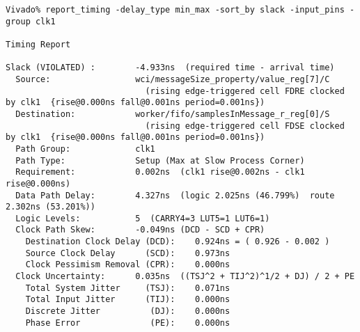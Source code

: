 \documentclass{article}
\begin{document}
\begin{lstlisting}
Vivado% report_timing -delay_type min_max -sort_by slack -input_pins -group clk1

Timing Report

Slack (VIOLATED) :        -4.933ns  (required time - arrival time)
  Source:                 wci/messageSize_property/value_reg[7]/C
                            (rising edge-triggered cell FDRE clocked by clk1  {rise@0.000ns fall@0.001ns period=0.001ns})
  Destination:            worker/fifo/samplesInMessage_r_reg[0]/S
                            (rising edge-triggered cell FDSE clocked by clk1  {rise@0.000ns fall@0.001ns period=0.001ns})
  Path Group:             clk1
  Path Type:              Setup (Max at Slow Process Corner)
  Requirement:            0.002ns  (clk1 rise@0.002ns - clk1 rise@0.000ns)
  Data Path Delay:        4.327ns  (logic 2.025ns (46.799%)  route 2.302ns (53.201%))
  Logic Levels:           5  (CARRY4=3 LUT5=1 LUT6=1)
  Clock Path Skew:        -0.049ns (DCD - SCD + CPR)
    Destination Clock Delay (DCD):    0.924ns = ( 0.926 - 0.002 )
    Source Clock Delay      (SCD):    0.973ns
    Clock Pessimism Removal (CPR):    0.000ns
  Clock Uncertainty:      0.035ns  ((TSJ^2 + TIJ^2)^1/2 + DJ) / 2 + PE
    Total System Jitter     (TSJ):    0.071ns
    Total Input Jitter      (TIJ):    0.000ns
    Discrete Jitter          (DJ):    0.000ns
    Phase Error              (PE):    0.000ns


\end{lstlisting}
\end{document}
